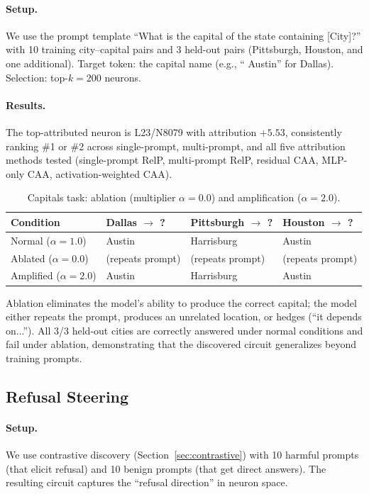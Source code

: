 \documentclass[11pt]{article}
\begin{document}
\paragraph{Setup.}
We use the prompt template ``What is the capital of the state containing [City]?'' with 10 training city--capital pairs and 3 held-out pairs (Pittsburgh, Houston, and one additional).
Target token: the capital name (e.g., `` Austin'' for Dallas).
Selection: top-$k = 200$ neurons.

\paragraph{Results.}
The top-attributed neuron is L23/N8079 with attribution $+5.53$, consistently ranking \#1 or \#2 across single-prompt, multi-prompt, and all five attribution methods tested (single-prompt RelP, multi-prompt RelP, residual CAA, MLP-only CAA, activation-weighted CAA).

\begin{table}[ht]
\centering
\caption{Capitals task: ablation (multiplier $\alpha{=}0.0$) and amplification ($\alpha{=}2.0$).}
\label{tab:capitals}
\begin{tabular}{llll}
\toprule
\textbf{Condition} & \textbf{Dallas $\to$ ?} & \textbf{Pittsburgh $\to$ ?} & \textbf{Houston $\to$ ?} \\
\midrule
Normal ($\alpha{=}1.0$)    & Austin          & Harrisburg       & Austin \\
Ablated ($\alpha{=}0.0$)   & (repeats prompt) & (repeats prompt) & (repeats prompt) \\
Amplified ($\alpha{=}2.0$) & Austin          & Harrisburg       & Austin \\
\bottomrule
\end{tabular}
\end{table}

Ablation eliminates the model's ability to produce the correct capital; the model either repeats the prompt, produces an unrelated location, or hedges (``it depends on...'').
All 3/3 held-out cities are correctly answered under normal conditions and fail under ablation, demonstrating that the discovered circuit generalizes beyond training prompts.


\subsection{Refusal Steering}
\label{sec:refusal}

\paragraph{Setup.}
We use contrastive discovery (Section~\ref{sec:contrastive}) with 10 harmful prompts (that elicit refusal) and 10 benign prompts (that get direct answers).
The resulting circuit captures the ``refusal direction'' in neuron space.
\end{document}
